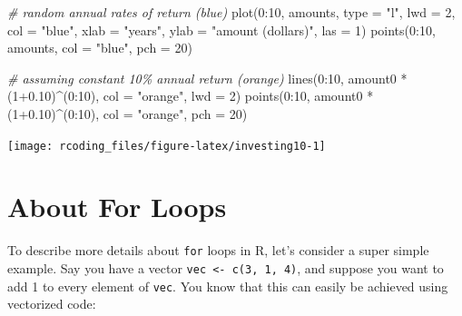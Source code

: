\documentclass[
]{book}
\newenvironment{Shaded}{\begin{snugshade}}{\end{snugshade}}
\newcommand{\AttributeTok}[1]{\textcolor[rgb]{0.77,0.63,0.00}{#1}}
\newcommand{\CommentTok}[1]{\textcolor[rgb]{0.56,0.35,0.01}{\textit{#1}}}
\newcommand{\DecValTok}[1]{\textcolor[rgb]{0.00,0.00,0.81}{#1}}
\newcommand{\FloatTok}[1]{\textcolor[rgb]{0.00,0.00,0.81}{#1}}
\newcommand{\FunctionTok}[1]{\textcolor[rgb]{0.00,0.00,0.00}{#1}}
\newcommand{\NormalTok}[1]{#1}
\newcommand{\SpecialCharTok}[1]{\textcolor[rgb]{0.00,0.00,0.00}{#1}}
\newcommand{\StringTok}[1]{\textcolor[rgb]{0.31,0.60,0.02}{#1}}
\begin{document}
\begin{Shaded}
\begin{Highlighting}[]
\CommentTok{\# random annual rates of return (blue)}
\FunctionTok{plot}\NormalTok{(}\DecValTok{0}\SpecialCharTok{:}\DecValTok{10}\NormalTok{, amounts, }\AttributeTok{type =} \StringTok{"l"}\NormalTok{, }\AttributeTok{lwd =} \DecValTok{2}\NormalTok{, }\AttributeTok{col =} \StringTok{"blue"}\NormalTok{,}
     \AttributeTok{xlab =} \StringTok{"years"}\NormalTok{, }\AttributeTok{ylab =} \StringTok{"amount (dollars)"}\NormalTok{, }\AttributeTok{las =} \DecValTok{1}\NormalTok{)}
\FunctionTok{points}\NormalTok{(}\DecValTok{0}\SpecialCharTok{:}\DecValTok{10}\NormalTok{, amounts, }\AttributeTok{col =} \StringTok{"blue"}\NormalTok{, }\AttributeTok{pch =} \DecValTok{20}\NormalTok{)}

\CommentTok{\# assuming constant 10\% annual return (orange)}
\FunctionTok{lines}\NormalTok{(}\DecValTok{0}\SpecialCharTok{:}\DecValTok{10}\NormalTok{, amount0 }\SpecialCharTok{*}\NormalTok{ (}\DecValTok{1}\FloatTok{+0.10}\NormalTok{)}\SpecialCharTok{\^{}}\NormalTok{(}\DecValTok{0}\SpecialCharTok{:}\DecValTok{10}\NormalTok{), }\AttributeTok{col =} \StringTok{"orange"}\NormalTok{, }\AttributeTok{lwd =} \DecValTok{2}\NormalTok{)}
\FunctionTok{points}\NormalTok{(}\DecValTok{0}\SpecialCharTok{:}\DecValTok{10}\NormalTok{, amount0 }\SpecialCharTok{*}\NormalTok{ (}\DecValTok{1}\FloatTok{+0.10}\NormalTok{)}\SpecialCharTok{\^{}}\NormalTok{(}\DecValTok{0}\SpecialCharTok{:}\DecValTok{10}\NormalTok{), }\AttributeTok{col =} \StringTok{"orange"}\NormalTok{, }\AttributeTok{pch =} \DecValTok{20}\NormalTok{)}
\end{Highlighting}
\end{Shaded}

\begin{center}\texttt{[image: rcoding\_files/figure-latex/investing10-1]} \end{center}

\hypertarget{about-for-loops}{%
\section{About For Loops}\label{about-for-loops}}

To describe more details about \texttt{for} loops in R, let's consider a super simple
example. Say you have a vector \texttt{vec\ \textless{}-\ c(3,\ 1,\ 4)}, and suppose you want to add
1 to every element of \texttt{vec}. You know that this can easily be achieved using
vectorized code:
\end{document}
